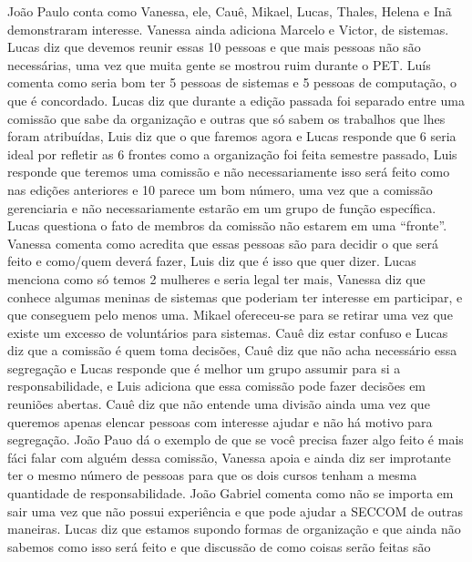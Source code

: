 \documentclass{ata-calico}
\begin{document}
\maketitle


João Paulo conta como Vanessa, ele, Cauê, Mikael, Lucas, Thales, Helena e Inã
demonstraram interesse. Vanessa ainda adiciona Marcelo e Victor, de sistemas.
Lucas diz que devemos reunir essas 10 pessoas e que mais pessoas não são
necessárias, uma vez que muita gente se mostrou ruim durante o PET\@. Luís
comenta como seria bom ter 5 pessoas de sistemas e 5 pessoas de computação, o
que é concordado. Lucas diz que durante a edição passada foi separado entre uma
comissão que sabe da organização e outras que só sabem os trabalhos que lhes
foram atribuídas, Luis diz que o que faremos agora e Lucas responde que 6 seria
ideal por refletir as 6 frontes como a organização foi feita semestre passado,
Luis responde que teremos uma comissão e não necessariamente isso será feito
como nas edições anteriores e 10 parece um bom número, uma vez que a comissão
gerenciaria e não necessariamente estarão em um grupo de função específica.
Lucas questiona o fato de membros da comissão não estarem em uma ``fronte''.
Vanessa comenta como acredita que essas pessoas são para decidir o que será
feito e como/quem deverá fazer, Luis diz que é isso que quer dizer. Lucas
menciona como só temos 2 mulheres e seria legal ter mais, Vanessa diz que
conhece algumas meninas de sistemas que poderiam ter interesse em participar, e
que conseguem pelo menos uma. Mikael ofereceu-se para se retirar uma vez que
existe um excesso de voluntários para sistemas. Cauê diz estar confuso e Lucas
diz que a comissão é quem toma decisões, Cauê diz que não acha necessário essa
segregação e Lucas responde que é melhor um grupo assumir para si a
responsabilidade, e Luis adiciona que essa comissão pode fazer decisões em
reuniões abertas. Cauê diz que não entende uma divisão ainda uma vez que
queremos apenas elencar pessoas com interesse ajudar e não há motivo para
segregação. João Pauo dá o exemplo de que se você precisa fazer algo feito é
mais fáci falar com alguém dessa comissão, Vanessa apoia e ainda diz ser
improtante ter o mesmo número de pessoas para que os dois cursos tenham a mesma
quantidade de responsabilidade. João Gabriel comenta como não se importa em
sair uma vez que não possui experiência e que pode ajudar a SECCOM de outras
maneiras. Lucas diz que estamos supondo formas de organização e que ainda não
sabemos como isso será feito e que discussão de como coisas serão feitas são
\end{document}
